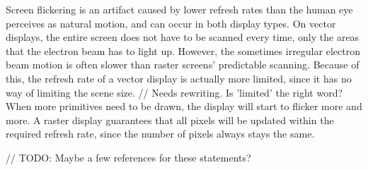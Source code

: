 Screen flickering is an artifact caused by lower refresh rates than the human eye perceives as natural motion, and can occur in both display types. \cite{flicker}
On vector displays, the entire screen does not have to be scanned every time, only the areas that the electron beam has to light up.
However, the sometimes irregular electron beam motion is often slower than raster screens' predictable scanning.
Because of this, the refresh rate of a vector display is actually more limited, since it has no way of limiting the scene size. // Needs rewriting. Is 'limited' the right word?
When more primitives need to be drawn, the display will start to flicker more and more.
A raster display guarantees that all pixels will be updated within the required refresh rate, since the number of pixels always stays the same.

// TODO: Maybe a few references for these statements?
